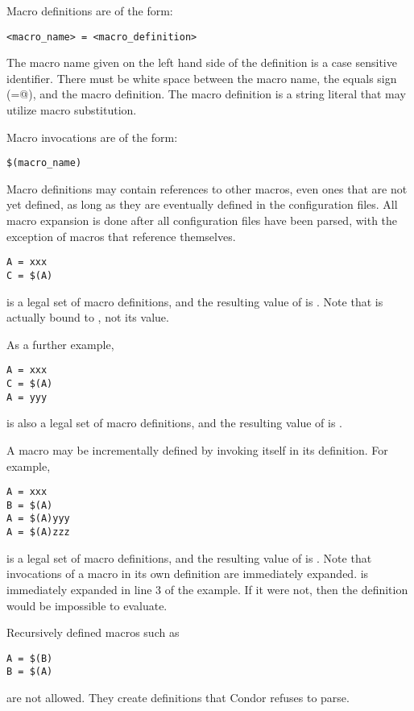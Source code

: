 
Macro definitions are of the form:
\begin{verbatim}
<macro_name> = <macro_definition>
\end{verbatim}

The macro name given on the left hand side of the definition is
a case sensitive identifier.
There must be white space between the macro name, the
equals sign (\verb@=@), and the macro definition.
The macro definition is a string literal that may utilize macro substitution.

Macro invocations are of the form: 
\begin{verbatim}
$(macro_name)
\end{verbatim}

Macro definitions may contain references to other macros, even ones
that are not yet defined, as long as they are eventually defined in
the configuration files.
All macro expansion is done after all configuration files have been parsed,
with the exception of macros that reference themselves.

\begin{verbatim}
A = xxx
C = $(A) 
\end{verbatim}
is a legal set of macro definitions, and the resulting value of 
 is
.
Note that
 is actually bound to 
, not its value.

As a further example,
\begin{verbatim}
A = xxx
C = $(A)
A = yyy
\end{verbatim}
is also a legal set of macro definitions, and the resulting value of
 is .  

A macro may be incrementally defined by invoking itself in its
definition.  For example,
\begin{verbatim}
A = xxx
B = $(A)
A = $(A)yyy
A = $(A)zzz
\end{verbatim}
is a legal set of macro definitions, and the resulting value of 
is .
Note that invocations of a macro in
its own definition are immediately
expanded.
 is immediately expanded in line 3 of the example.
If it were not, then the definition would be impossible to
evaluate.

Recursively defined macros such as
\begin{verbatim}
A = $(B)
B = $(A)
\end{verbatim}
are not allowed.
They create definitions that Condor refuses to parse. 

